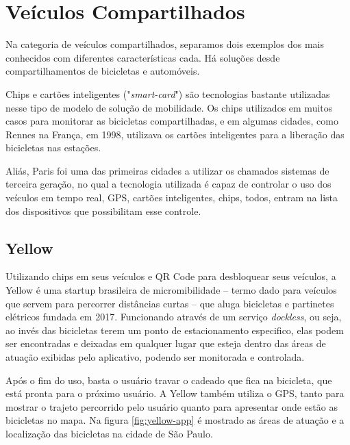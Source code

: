 \section{Veículos Compartilhados}
Na categoria de veículos compartilhados, separamos dois exemplos dos mais conhecidos com diferentes características cada. Há soluções desde compartilhamentos de bicicletas e automóveis.  %

Chips e cartões inteligentes ("\textit{smart-card}") são tecnologias bastante utilizadas nesse tipo de modelo de solução de mobilidade. Os chips utilizados em muitos casos para monitorar as bicicletas compartilhadas, e em algumas cidades, como Rennes na França, em 1998, utilizava os cartões inteligentes para a liberação das bicicletas nas estações.%

Aliás, Paris foi uma das primeiras cidades a utilizar os chamados sistemas de terceira geração, no qual a tecnologia utilizada é capaz de controlar o uso dos veículos em tempo real, GPS, cartões inteligentes, chips, todos, entram na lista dos dispositivos que possibilitam esse controle.

\subsection{Yellow}

Utilizando chips em seus veículos e QR Code para desbloquear seus veículos, a Yellow é uma startup brasileira de micromibilidade -- termo dado para veículos que servem para percorrer distâncias curtas -- que aluga bicicletas e partinetes elétricos fundada em 2017. Funcionando através de um serviço \textit{dockless}, ou seja, ao invés das bicicletas terem um ponto de estacionamento especifico, elas podem ser encontradas e deixadas em qualquer lugar que esteja dentro das áreas de atuação exibidas pelo aplicativo, podendo ser monitorada e controlada. 

Após o fim do uso, basta o usuário travar o cadeado que fica na bicicleta, que está pronta para o próximo usuário. A Yellow também utiliza o GPS, tanto para mostrar o trajeto percorrido pelo usuário quanto para apresentar onde estão as bicicletas no mapa. Na figura \ref{fig:yellow-app} é mostrado as áreas de atuação e a localização das bicicletas na cidade de São Paulo.

